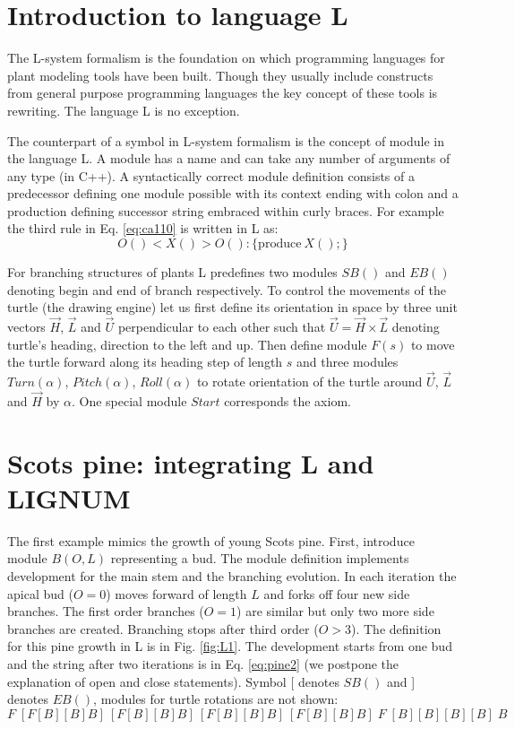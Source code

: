 \section{Introduction to language L}

The  L-system  formalism  is   the  foundation  on  which  programming
languages  for  plant modeling  tools  have  been  built. Though  they
usually include constructs  from general purpose programming languages
the key  concept of  these tools  is rewriting. The  language L  is no
exception.

The counterpart  of a symbol in  L-system formalism is  the concept of
module in the language L. A module  has a name and can take any number
of arguments  of any  type (in C++).   A syntactically  correct module
definition consists of a predecessor defining one module possible with
its  context ending  with colon  and a  production  defining successor
string embraced  within curly braces.   For example the third  rule in
Eq. \ref{eq:ca110} is written in L as:
\begin{equation}
 O() < X() > O(): \{\mathrm{produce}\ X();\}
\end{equation}

For branching structures of plants L predefines two modules $SB()$ and
$EB()$ denoting begin and end  of branch respectively.  To control the
movements of the  turtle (the drawing engine) let  us first define its
orientation  in space by  three unit  vectors $\vec  H$, $\vec  L$ and
$\vec U$ perpendicular to each other such that $\vec U = \vec H \times
\vec L$ denoting turtle's heading,  direction to the left and up. Then
define module $F(s)$ to move the turtle forward along its heading step
of  length  $s$  and  three modules  $Turn(\alpha)$,  $Pitch(\alpha)$,
$Roll(\alpha)$ to  rotate orientation of  the turtle around  $\vec U$,
$\vec  L$  and $\vec  H$  by  $\alpha$.   One special  module  $Start$
corresponds the axiom.

\section{Scots pine: integrating L and LIGNUM}\label{sec:pine}
The  first example  mimics the  growth  of young  Scots pine.   First,
introduce module  $B(O,L)$ representing a bud.   The module definition
implements development for the  main stem and the branching evolution.
In each iteration the apical bud ($O = 0$) moves forward of length $L$
and forks off four new side  branches.  The first order branches ($O =
1$)  are  similar  but  only  two  more  side  branches  are  created.
Branching stops after third order  ($O > 3$).  The definition for this
pine growth in L is in Fig.  \ref{fig:L1}. The development starts from
one bud and  the string after two iterations  is in Eq. \ref{eq:pine2}
(we postpone the  explanation of open and close  statements). Symbol [
denotes $SB()$ and ] denotes  $EB()$, modules for turtle rotations are
not shown:
\begin{equation}\label{eq:pine2}
F\;[F[B][B]B]\:[F[B][B]B]\:[F[B][B]B]\:[F[B][B]B]\; F \;[B][B][B][B]\; B
\end{equation}

